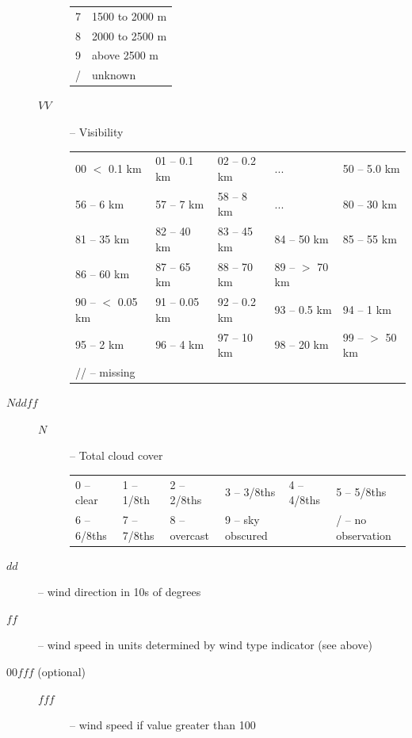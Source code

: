 \documentclass{article}
\begin{document}
\begin{description}
\begin{description}
\begin{tabular}{cl}
      7 & 1500 to 2000 m\\
      8 & 2000 to 2500 m\\
      9 & above 2500 m\\
      / & unknown\\
    \end{tabular}
  \item[$VV$] -- Visibility
    \begin{tabular}{lllll}
      00 $<$ 0.1 km & 01 -- 0.1 km & 02 -- 0.2 km & ... & 50 -- 5.0 km\\
      56 -- 6 km          & 57 -- 7 km   & 58 -- 8 km   & ... & 80 -- 30 km \\
      81 -- 35 km         & 82 -- 40 km  & 83 -- 45 km  & 84 -- 50 km & 85 -- 55 km\\
      86 -- 60 km         & 87 -- 65 km  & 88 -- 70 km  & 89 -- $>$ 70 km & \\
      90 -- $<$ 0.05 km     &91 -- 0.05 km & 92 -- 0.2 km & 93 -- 0.5 km & 94 -- 1 km\\
      95 -- 2 km          &96 -- 4 km    & 97 -- 10 km & 98 -- 20 km & 99 -- $>$ 50 km\\
      // -- missing       &              &             &             &               \\
    \end{tabular}
  \end{description}
\end{description}
\begin{description}
\item[$Nddff$]
  \begin{description}
  \item[$ N$] -- Total cloud cover
    \begin{tabular}{llllll}
      0 -- clear & 1 -- 1/8th & 2 -- 2/8ths & 3 -- 3/8ths &  4 -- 4/8ths& 5 -- 5/8ths \\
      6 -- 6/8ths& 7 -- 7/8ths & 8 -- overcast & 9 -- sky obscured & &/ -- no observation
    \end{tabular}
  \end{description}
\item[$dd$] -- wind direction in 10s of degrees 
\item[$ff$] -- wind speed in units determined by wind type indicator (see above)
\end{description}
\begin{description}
\item[$00fff$ (optional)]
  \begin{description}
  \item[$fff$] -- wind speed if value greater than 100
  \end{description}
\end{description}
\end{document}
